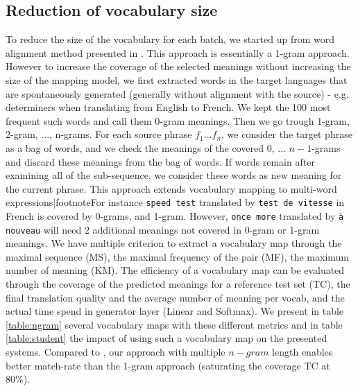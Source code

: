 \documentclass[11pt,a4paper]{article}
\begin{document}
\subsection{Reduction of vocabulary size}
To reduce the size of the vocabulary for each batch, we started up from word alignment method presented in \cite{shi2017speeding}. This approach is essentially a 1-gram approach. However to increase the coverage of the selected meanings without increasing the size of the mapping model, we first extracted words in the target languages that are spontaneously generated (generally without alignment with the source) - e.g. determiners when translating from English to French. We kept the 100 most frequent such words and call them 0-gram meanings. Then we go trough 1-gram, 2-gram, ..., n-grams. For each source phrase $f_1 ... f_n$, we consider the target phrase as a bag of words, and we check the meanings of the covered $0$, ... $n-1$-grams and discard these meanings from the bag of words. If words remain after examining all of the sub-sequence, we consider these words as new meaning for the current phrase. This approach extends vocabulary mapping to multi-word expressions|footnote{For instance {\tt speed test} translated by {\tt test de vitesse} in French is covered by 0-grams, and 1-gram. However, {\tt once more} translated by {\tt à nouveau} will need 2 additional meanings not covered in 0-gram or 1-gram meanings}. We have multiple criterion to extract a vocabulary map through the maximal sequence (MS), the maximal frequency of the pair (MF), the maximum number of meaning (KM). The efficiency of a vocabulary map can be evaluated through the coverage of the predicted meanings  for a reference test set (TC), the final translation quality and the average number of meaning per vocab, and the actual time spend in generator layer (Linear and Softmax).
We present in table \ref{table:ngram} several vocabulary maps with these different metrics and in table \ref{table:student} the impact of using such a vocabulary map on the presented systems. Compared to \cite{shi2017speeding}, our approach with multiple $n-gram$ length enables better match-rate than the 1-gram approach (saturating the coverage TC at 80\%).
\end{document}
